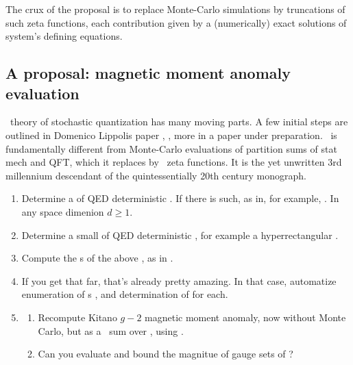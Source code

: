 The crux of the proposal is to replace Monte-Carlo simulations by
truncations of such zeta functions, each contribution given by a (numerically)
exact solutions of system's defining equations.

\subsection{A proposal: 
					  {\Dft} magnetic moment anomaly evaluation}
\label{sect:PCproposal}

\Spt\ theory of stochastic quantization has many moving parts.
A few initial steps are outlined in Domenico Lippolis paper , ,
more in a paper under preparation.
\Dft\ is fundamentally different from Monte-Carlo evaluations of 
partition sums of stat mech and QFT, which it replaces by \spt\ zeta functions.
It is the yet unwritten 3rd millennium descendant of the quintessentially 20th 
century \wwwcb{} monograph.

\begin{enumerate}
	\item 
Determine  a {\steady} of QED deterministic {\ELe}.
If there is such, as in, for example,
. In any space dimenion $d\geq1$.
	\item 
Determine  a small {\pcell} {\lst} of QED deterministic {\ELe}, for example a hyperrectangular  \lst.
	\item 
Compute the {\stabexp}s of the above \lsts, as in 
.
	\item 
If you get that far, that's already pretty amazing. In that case,
automatize enumeration of {\Blatt}s 
, 
and determination of {\lsts} for each.
	\item  
	\begin{enumerate}
		\item  
Recompute  Kitano {$g-2$} magnetic moment anomaly,
now without Monte Carlo, but as a \detZeta\ sum over {\lsts}, using 
.
		\item Can  you evaluate and bound the magnitue of gauge sets  of ?
	\end{enumerate}
\end{enumerate}

